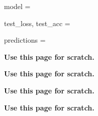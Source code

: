 \documentclass[10pt]{article}
\begin{document}
\begin{enumerate}


\fi

model = 

\newpage



test\_loss, test\_acc = 

\bigskip
\bigskip
\bigskip
\bigskip
\bigskip
\bigskip
\bigskip
\bigskip
\bigskip
\bigskip
\bigskip
\bigskip



predictions = 

\bigskip
\bigskip
\bigskip
\bigskip
\bigskip
\bigskip
\bigskip
\bigskip
\bigskip
\bigskip
\bigskip
\bigskip



\newpage

\begin{center}
	\begin{LARGE}
\textbf{Use this page for scratch.}	\end{LARGE}
\end{center}

\newpage
\begin{center}
	\begin{LARGE}
		\textbf{Use this page for scratch.}	\end{LARGE}
\end{center}

\newpage

\begin{center}
	\begin{LARGE}
		\textbf{Use this page for scratch.}	\end{LARGE}
\end{center}
\newpage

\begin{center}
	\begin{LARGE}
		\textbf{Use this page for scratch.}	\end{LARGE}
\end{center}

\end{enumerate}
\end{document}
